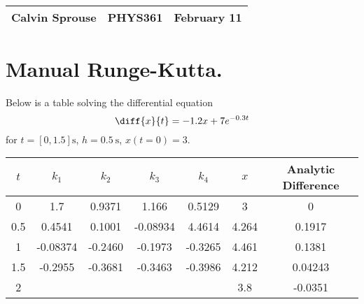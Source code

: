 \documentclass[a4paper, 12pt]{config/homework}
\begin{document}
\noindent
\begin{tabularx}{\textwidth}{>{\centering\arraybackslash}X>{\centering\arraybackslash}X>{\centering\arraybackslash}X}
Calvin Sprouse & PHYS361 & 2024 February 11\\
\midrule
\end{tabularx}

\noindent
\section*{Manual Runge-Kutta.}
Below is a table solving the differential equation
\[\diff{x}{t} = -1.2x + 7e^{-0.3t}\]
for \(t=[0,1.5]\text{s}\), \(h=\qty{0.5}{\second}\), \(x(t=0)=3\).

\begin{table}[H]
    \centering
    \begin{tabular}{c|cccc|c|c}
    $t$ & $k_1$ & $k_2$ & $k_3$ & $k_4$ & $x$ & Analytic Difference \\ \hline
    0 & 1.7 & 0.9371 & 1.166 & 0.5129 & 3 & 0 \\
    0.5 & 0.4541 & 0.1001 & -0.08934 & 4.4614 & 4.264 & 0.1917 \\
    1 & -0.08374 & -0.2460 & -0.1973 & -0.3265 & 4.461 & 0.1381 \\
    1.5 & -0.2955 & -0.3681 & -0.3463 & -0.3986 & 4.212 & 0.04243 \\
    2 &  &  &  &  & 3.8 & -0.0351
    \end{tabular}
\end{table}
\end{document}
